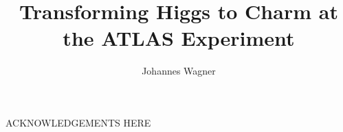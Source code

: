 \documentclass{ucbthesis}
\begin{document}

\title{Transforming Higgs to Charm at the ATLAS Experiment}
\author{Johannes Wagner}


\maketitle
\approvalpage
\copyrightpage



\begin{frontmatter}


\tableofcontents
\clearpage
\listoffigures
\clearpage
\listoftables

\begin{acknowledgements}
ACKNOWLEDGEMENTS HERE

\end{acknowledgements}

\end{frontmatter}

\pagestyle{headings}





\end{document}
